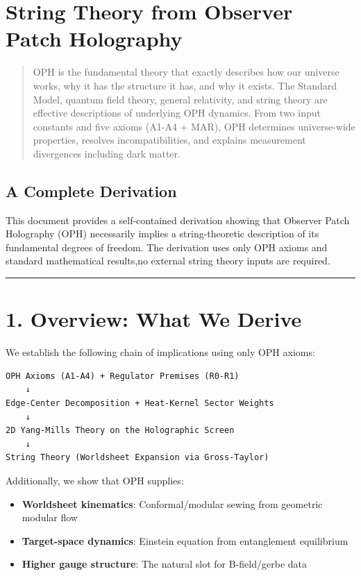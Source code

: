 \section{String Theory from Observer Patch Holography}\label{string-theory-from-observer-patch-holography}

\begin{quote}
OPH is the fundamental theory that exactly describes how our universe works, why it has the structure it has, and why it exists. The Standard Model, quantum field theory, general relativity, and string theory are effective descriptions of underlying OPH dynamics. From two input constants and five axioms (A1-A4 + MAR), OPH determines universe-wide properties, resolves incompatibilities, and explains measurement divergences including dark matter.
\end{quote}

\subsection{A Complete Derivation}\label{a-complete-derivation}

This document provides a self-contained derivation showing that Observer Patch Holography (OPH) necessarily implies a string-theoretic description of its fundamental degrees of freedom. The derivation uses only OPH axioms and standard mathematical results,no external string theory inputs are required.

\begin{center}\rule{0.5\linewidth}{0.5pt}\end{center}

\section{1. Overview: What We Derive}\label{1-overview-what-we-derive}

We establish the following chain of implications using only OPH axioms:

\begin{verbatim}
OPH Axioms (A1-A4) + Regulator Premises (R0-R1)
    ↓
Edge-Center Decomposition + Heat-Kernel Sector Weights
    ↓
2D Yang-Mills Theory on the Holographic Screen
    ↓
String Theory (Worldsheet Expansion via Gross-Taylor)
\end{verbatim}

Additionally, we show that OPH supplies:

\begin{itemize}
\tightlist
\item
  \textbf{Worldsheet kinematics}: Conformal/modular sewing from geometric modular flow
\item
  \textbf{Target-space dynamics}: Einstein equation from entanglement equilibrium
\item
  \textbf{Higher gauge structure}: The natural slot for B-field/gerbe data
\end{itemize}

